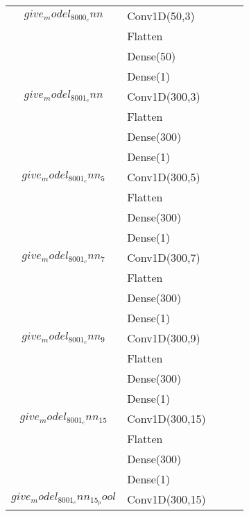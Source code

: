 \begin{longtable}{| c | m{0.58\linewidth} | r | m{0.1\linewidth} |}
    $give_model_8000_cnn$          & Conv1D(50,3)              \\
                                   & Flatten                   \\
                                   & Dense(50)                 \\
                                   & Dense(1)                  \\ \hline
    $give_model_8001_cnn$          & Conv1D(300,3)             \\
                                   & Flatten                   \\
                                   & Dense(300)                \\
                                   & Dense(1)                  \\ \hline
    $give_model_8001_cnn_5$        & Conv1D(300,5)             \\
                                   & Flatten                   \\
                                   & Dense(300)                \\
                                   & Dense(1)                  \\ \hline
    $give_model_8001_cnn_7$        & Conv1D(300,7)             \\
                                   & Flatten                   \\
                                   & Dense(300)                \\
                                   & Dense(1)                  \\ \hline
    $give_model_8001_cnn_9$        & Conv1D(300,9)             \\
                                   & Flatten                   \\
                                   & Dense(300)                \\
                                   & Dense(1)                  \\ \hline
    $give_model_8001_cnn_15$       & Conv1D(300,15)            \\
                                   & Flatten                   \\
                                   & Dense(300)                \\
                                   & Dense(1)                  \\ \hline
    $give_model_8001_cnn_15_pool$  & Conv1D(300,15)            \\

\end{longtable}
